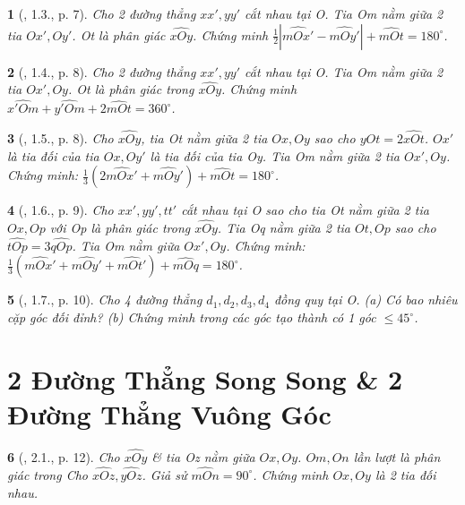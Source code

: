 \documentclass{article}
\newtheorem{baitoan}{}
\begin{document}
\begin{baitoan}[\cite{Hung_Mai_Toan_7_hinh_hoc}, 1.3., p. 7]
	Cho 2 đường thẳng $xx',yy'$ cắt nhau tại O. Tia Om nằm giữa 2 tia $Ox',Oy'$. Ot là phân giác $\widehat{xOy}$. Chứng minh $\frac{1}{2}|\widehat{mOx'} - \widehat{mOy'}| + \widehat{mOt} = 180^\circ$.
\end{baitoan}

\begin{baitoan}[\cite{Hung_Mai_Toan_7_hinh_hoc}, 1.4., p. 8]
	Cho 2 đường thẳng $xx',yy'$ cắt nhau tại O. Tia Om nằm giữa 2 tia $Ox',Oy$. Ot là phân giác trong $\widehat{xOy}$. Chứng minh $\widehat{x'Om} + \widehat{y'Om} + 2\widehat{mOt} = 360^\circ$.
\end{baitoan}

\begin{baitoan}[\cite{Hung_Mai_Toan_7_hinh_hoc}, 1.5., p. 8]
	Cho $\widehat{xOy}$, tia Ot nằm giữa 2 tia $Ox,Oy$ sao cho $\widehat{yOt} = 2\widehat{xOt}$. $Ox'$ là tia đối của tia $Ox,Oy'$ là tia đối của tia Oy. Tia Om nằm giữa 2 tia $Ox',Oy$. Chứng minh: $\frac{1}{3}(2\widehat{mOx'} + \widehat{mOy'}) + \widehat{mOt} = 180^\circ$.
\end{baitoan}

\begin{baitoan}[\cite{Hung_Mai_Toan_7_hinh_hoc}, 1.6., p. 9]
	Cho $xx',yy',tt'$ cắt nhau tại O sao cho tia Ot nằm giữa 2 tia $Ox,Op$ với Op là phân giác trong $\widehat{xOy}$. Tia Oq nằm giữa 2 tia $Ot,Op$ sao cho $\widehat{tOp} = 3\widehat{qOp}$. Tia Om nằm giữa $Ox',Oy$. Chứng minh: $\frac{1}{3}(\widehat{mOx'} + \widehat{mOy'} + \widehat{mOt'}) + \widehat{mOq} = 180^\circ$.
\end{baitoan}

\begin{baitoan}[\cite{Hung_Mai_Toan_7_hinh_hoc}, 1.7., p. 10]
	Cho 4 đường thẳng $d_1,d_2,d_3,d_4$ đồng quy tại O. (a) Có bao nhiêu cặp góc đối đỉnh? (b) Chứng minh trong các góc tạo thành có 1 góc $\le45^\circ$.
\end{baitoan}


\section{2 Đường Thẳng Song Song \& 2 Đường Thẳng Vuông Góc}

\begin{baitoan}[\cite{Hung_Mai_Toan_7_hinh_hoc}, 2.1., p. 12]
	Cho $\widehat{xOy}$ \& tia Oz nằm giữa $Ox,Oy$. $Om,On$ lần lượt là phân giác trong Cho $\widehat{xOz},\widehat{yOz}$. Giả sử $\widehat{mOn} = 90^\circ$. Chứng minh $Ox,Oy$ là 2 tia đối nhau.
\end{baitoan}
\end{document}
